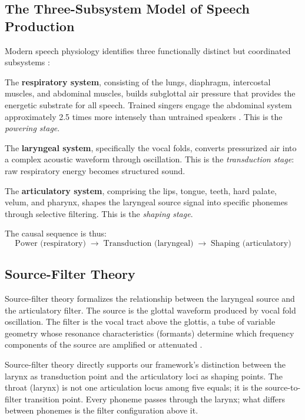 \documentclass[12pt]{article}
\begin{document}
\subsection{The Three-Subsystem Model of Speech Production}

Modern speech physiology identifies three functionally distinct but coordinated subsystems \citep{zemlin1998, kent1997}:

The \textbf{respiratory system}, consisting of the lungs, diaphragm, intercostal muscles, and abdominal muscles, builds subglottal air pressure that provides the energetic substrate for all speech. Trained singers engage the abdominal system approximately 2.5 times more intensely than untrained speakers \citep{sundberg1987}. This is the \textit{powering stage}.

The \textbf{laryngeal system}, specifically the vocal folds, converts pressurized air into a complex acoustic waveform through oscillation. This is the \textit{transduction stage}: raw respiratory energy becomes structured sound.

The \textbf{articulatory system}, comprising the lips, tongue, teeth, hard palate, velum, and pharynx, shapes the laryngeal source signal into specific phonemes through selective filtering. This is the \textit{shaping stage}.

The causal sequence is thus:
\[
\text{Power (respiratory)} \;\to\; \text{Transduction (laryngeal)} \;\to\; \text{Shaping (articulatory)}
\]

\subsection{Source-Filter Theory}

Source-filter theory \citep{fant1960} formalizes the relationship between the laryngeal source and the articulatory filter. The source is the glottal waveform produced by vocal fold oscillation. The filter is the vocal tract above the glottis, a tube of variable geometry whose resonance characteristics (formants) determine which frequency components of the source are amplified or attenuated \citep{peterson1952}.

Source-filter theory directly supports our framework's distinction between the larynx as transduction point and the articulatory loci as shaping points. The throat (larynx) is not one articulation locus among five equals; it is the source-to-filter transition point. Every phoneme passes through the larynx; what differs between phonemes is the filter configuration above it.
\end{document}
